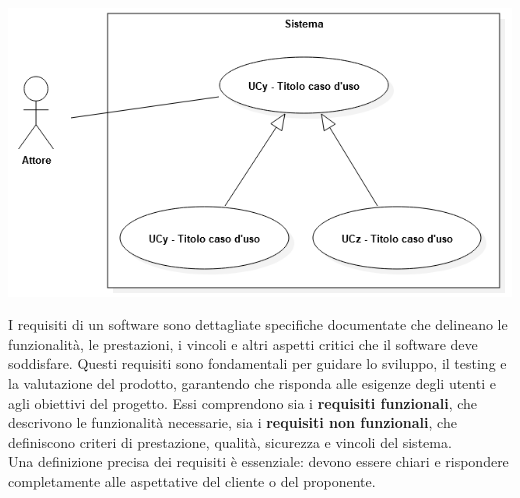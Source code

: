 \begin{itemize}
\begin{itemize}
		            \begin{center}
			            \includegraphics*[width=15cm]{../../../images/norme_di_progetto/generalizzazioneCasiDiUso.png}
		            \end{center}
	      \end{itemize}
\end{itemize}

\newpage
{}
I requisiti di un software sono dettagliate specifiche documentate che delineano le funzionalità, le prestazioni, i vincoli e altri aspetti critici che il software deve soddisfare. Questi requisiti sono fondamentali per guidare lo sviluppo, il testing e la valutazione del prodotto, garantendo che risponda alle esigenze degli utenti e agli obiettivi del progetto. Essi comprendono sia i \textbf{requisiti funzionali}, che descrivono le funzionalità necessarie, sia i \textbf{requisiti non funzionali}, che definiscono criteri di prestazione, qualità, sicurezza e vincoli del sistema.\\
Una definizione precisa dei requisiti è essenziale: devono essere chiari e rispondere completamente alle aspettative del cliente o del proponente.

